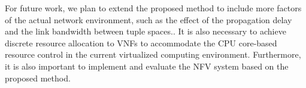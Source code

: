 \documentclass[technicalreport]{ieicej}
\begin{document}
	For future work, we plan to extend the proposed method to include more factors of the actual network environment, such as the effect of the propagation delay and the link bandwidth between tuple spaces..
	It is also necessary to achieve discrete resource allocation to VNFs to accommodate the CPU core-based resource control in the current virtualized computing environment.
	Furthermore, it is also important to implement and evaluate the NFV system based on the proposed method.

	
	
\end{document}
